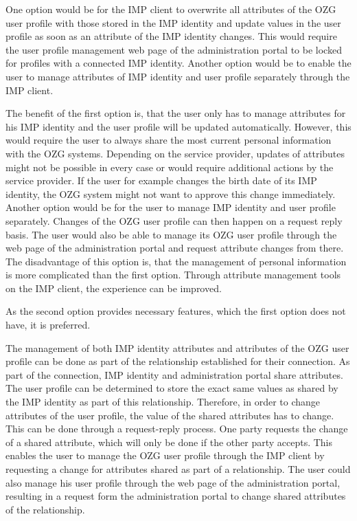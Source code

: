 One option would be for the IMP client to overwrite all attributes of the OZG user profile with those stored in the IMP identity and update values in the user profile as soon as an attribute of the IMP identity changes. This would require the user profile management web page of the administration portal to be locked for profiles with a connected IMP identity. Another option would be to enable the user to manage attributes of IMP identity and user profile separately through the IMP client.

The benefit of the first option is, that the user only has to manage attributes for his IMP identity and the user profile will be updated automatically. However, this would require the user to always share the most current personal information with the OZG systems. Depending on the service provider, updates of attributes might not be possible in every case or would require additional actions by the service provider. If the user for example changes the birth date of its IMP identity, the OZG system might not want to approve this change immediately. Another option would be for the user to manage IMP identity and user profile separately. Changes of the OZG user profile can then happen on a request reply basis. The user would also be able to manage its OZG user profile through the web page of the administration portal and request attribute changes from there. The disadvantage of this option is, that the management of personal information is more complicated than the first option. Through attribute management tools on the IMP client, the experience can be improved.

As the second option provides necessary features, which the first option does not have, it is preferred.

The management of both IMP identity attributes and attributes of the OZG user profile can be done as part of the relationship established for their connection. As part of the connection, IMP identity and administration portal share attributes. The user profile can be determined to store the exact same values as shared by the IMP identity as part of this relationship. Therefore, in order to change attributes of the user profile, the value of the shared attributes has to change. This can be done through a request-reply process. One party requests the change of a shared attribute, which will only be done if the other party accepts. This enables the user to manage the OZG user profile through the IMP client by requesting a change for attributes shared as part of a relationship. The user could also manage his user profile through the web page of the administration portal, resulting in a request form the administration portal to change shared attributes of the relationship.

